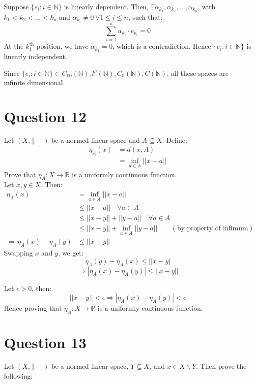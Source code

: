 \documentclass{article}
\begin{document}
	Suppose $\{e_i: i \in \mathbb{N}\}$ is linearly dependent.
	Then, $\exists \alpha_{k_1}, \alpha_{k_2}, \dots, \alpha_{k_n}$, with $k_1 < k_2 < \dots < k_n$
	and $\alpha_{k_i} \ne 0 ~ \forall 1 \le i \le n$, such that:
	\[ \sum_{i = 1}^{n} \alpha_{k_i} \cdot e_{k_i} = 0 \]
	At the $k_1^{\text{th}}$ position, we have $\alpha_{k_1} = 0$, which is a contradiction.
	Hence $\{e_i: i \in \mathbb{N}\}$ is linearly independent.

	Since $\{e_i: i \in \mathbb{N}\} \subset C_{00}(\mathbb{N}), l^p(\mathbb{N}), C_0(\mathbb{N}),
	C(\mathbb{N})$, all these spaces are infinite dimensional.

\section{Question 12}

	Let $(X, ||\cdot||)$ be a normed linear space and $A \subseteq X$.
	Define:
	\begin{align*}
		\eta_A(x) &= d(x, A) \\
		&= \inf_{a \in A} ||x - a||
	\end{align*}
	Prove that $\eta_A: X \to \mathbb{R}$ is a uniformly continuous function. \\

	Let $x, y \in X$.
	Then:
	\begin{align*}
		\eta_A(x) &= \inf_{a \in A} ||x - a|| \\
		&\le ||x - a|| \quad \forall a \in A \\
		&\le ||x - y|| + ||y - a|| \quad \forall a \in A \\
		&\le ||x - y|| + \inf_{a \in A} ||y - a|| \qquad (\text{by property of infimum}) \\
		\Rightarrow \eta_A(x) - \eta_A(y) &\le ||x - y||
	\end{align*}
	Swapping $x$ and $y$, we get:
	\[ \eta_A(y) - \eta_A(x) \le ||x - y| \]
	\[ \Rightarrow |\eta_A(x) - \eta_A(y)| \le ||x - y|| \]

	Let $\epsilon > 0$, then:
	\[ ||x - y|| < \epsilon \Rightarrow |\eta_A(x) - \eta_A(y)| < \epsilon \]
	Hence proving that $\eta_A: X \to \mathbb{R}$ is a uniformly continuous function.

\section{Question 13}

	Let $(X, ||\cdot||)$ be a normed linear space, $Y \subseteq X$, and $x \in X \backslash Y$.
	Then prove the following:
\end{document}
